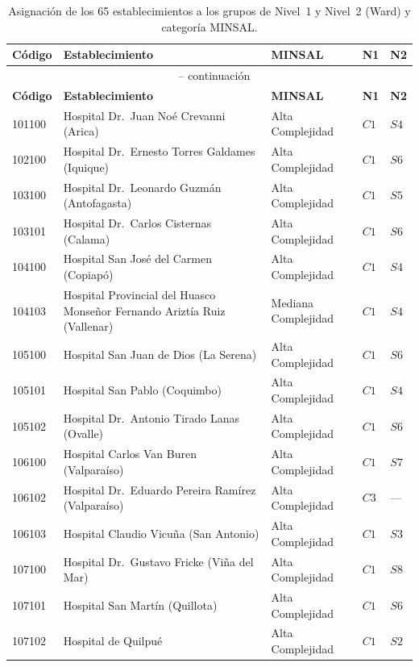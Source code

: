 \begin{longtable}{p{1.3cm} p{6.8cm} p{2.4cm} p{1.0cm} p{1.0cm}}
\caption{Asignación de los 65 establecimientos a los grupos de Nivel~1 y Nivel~2 (Ward) y categoría MINSAL.}
\label{tab:anexo-hospitales} \\
\toprule
\textbf{Código} & \textbf{Establecimiento} & \textbf{MINSAL} & \textbf{N1} & \textbf{N2} \\
\midrule
\endfirsthead

\multicolumn{5}{c}{\tablename\ \thetable{} -- continuación} \\
\toprule
\textbf{Código} & \textbf{Establecimiento} & \textbf{MINSAL} & \textbf{N1} & \textbf{N2} \\
\midrule
\endhead

101100 & Hospital Dr.\ Juan Noé Crevanni (Arica) & Alta Complejidad & $C1$ & $S4$ \\
102100 & Hospital Dr.\ Ernesto Torres Galdames (Iquique) & Alta Complejidad & $C1$ & $S6$ \\
103100 & Hospital Dr.\ Leonardo Guzmán (Antofagasta) & Alta Complejidad & $C1$ & $S5$ \\
103101 & Hospital Dr.\ Carlos Cisternas (Calama) & Alta Complejidad & $C1$ & $S6$ \\
104100 & Hospital San José del Carmen (Copiapó) & Alta Complejidad & $C1$ & $S4$ \\
104103 & Hospital Provincial del Huasco Monseñor Fernando Ariztía Ruiz (Vallenar) & Mediana Complejidad & $C1$ & $S4$ \\
105100 & Hospital San Juan de Dios (La Serena) & Alta Complejidad & $C1$ & $S6$ \\
105101 & Hospital San Pablo (Coquimbo) & Alta Complejidad & $C1$ & $S4$ \\
105102 & Hospital Dr.\ Antonio Tirado Lanas (Ovalle) & Alta Complejidad & $C1$ & $S6$ \\
106100 & Hospital Carlos Van Buren (Valparaíso) & Alta Complejidad & $C1$ & $S7$ \\
106102 & Hospital Dr.\ Eduardo Pereira Ramírez (Valparaíso) & Alta Complejidad & $C3$ & --- \\
106103 & Hospital Claudio Vicuña (San Antonio) & Alta Complejidad & $C1$ & $S3$ \\
107100 & Hospital Dr.\ Gustavo Fricke (Viña del Mar) & Alta Complejidad & $C1$ & $S8$ \\
107101 & Hospital San Martín (Quillota) & Alta Complejidad & $C1$ & $S6$ \\
107102 & Hospital de Quilpué & Alta Complejidad & $C1$ & $S2$ \\

\end{longtable}
